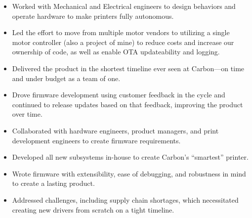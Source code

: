\documentclass[10pt,a4paper,ragged2e,withhyper]{altacv}
\begin{document}
\begin{paracol}{2}


\divider



\switchcolumn


\divider


\begin{itemize}
\item Worked with Mechanical and Electrical engineers to design behaviors and operate hardware to make printers fully autonomous.
\item Led the effort to move from multiple motor vendors to utilizing a single motor controller (also a project of mine) to reduce costs and increase our ownership of code, as well as enable OTA updateability and logging.
\item Delivered the product in the shortest timeline ever seen at Carbon—on time and under budget as a team of one.
\item Drove firmware development using customer feedback in the cycle and continued to release updates based on that feedback, improving the product over time.
\end{itemize}

\divider

\begin{itemize}
\item Collaborated with hardware engineers, product managers, and print development engineers to create firmware requirements.
\item Developed all new subsystems in-house to create Carbon’s “smartest” printer.
\item Wrote firmware with extensibility, ease of debugging, and robustness in mind to create a lasting product.
\item Addressed challenges, including supply chain shortages, which necessitated creating new drivers from scratch on a tight timeline.
\end{itemize}


\end{paracol}
\end{document}
